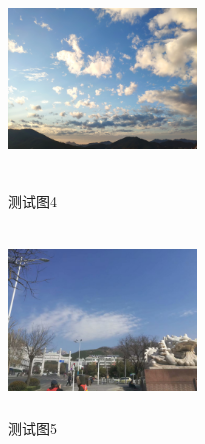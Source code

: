 \documentclass{ctexart}
\begin{document}
		\begin{figure}[htbp]
		\centering
		\begin{minipage}[c]{0.5\textwidth}
			\centering
			\includegraphics[width=5cm,height=5cm]{pic1}
			\caption{测试图4}
			\label{fig:4}
		\end{minipage}%
		\begin{minipage}[c]{0.5\textwidth}
			\centering
			\includegraphics[width=5cm,height=5cm]{pic2}	
			\caption{测试图5}
			\label{fig:5}
		\end{minipage}
	\end{figure}

\begin{figure}[htbp]
\end{figure}
\end{document}
